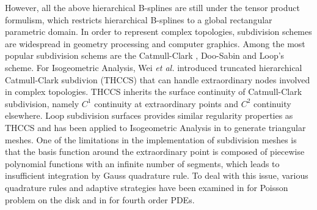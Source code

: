 \documentclass[preprint,12pt]{elsarticle}
\begin{document}
However, all the above hierarchical B-splines are still under the tensor product formulism, which restricts hierarchical B-splines to a global rectangular parametric domain. In order to represent complex topologies, subdivision schemes are widespread in geometry processing and computer graphics. Among the most popular subdivision schems are the Catmull-Clark \cite{catmull_recursively_1978}, Doo-Sabin \cite{doo_behaviour_1978} and Loop's \cite{loop_smooth_1987} scheme. For Isogeometric Analysis, Wei \textit{et al.} \cite{wei_truncated_2015} introduced truncated hierarchical Catmull-Clark subdivion (THCCS) that can handle extraordinary nodes involved in complex topologies. THCCS inherits the surface continuity of Catmull-Clark subdivision, namely $C^1$ continuity at extraordinary points and $C^2$ continuity elsewhere. Loop subdivision surfaces provides similar regularity properties as THCCS and has been applied to Isogeometric Analysis in \cite{kang_truncated_2016,pan_isogeometric_2015} to generate triangular meshes. One of the limitations in the implementation of subdivision meshes is that the basis function around the extraordinary point is composed of piecewise polynomial functions with an infinite number of segments, which leads to insufficient integration by Gauss quadrature rule. To deal with this issue, various quadrature rules and adaptive strategies have been examined in \cite{nguyen_comparative_2014} for Poisson problem on the disk and in \cite{juttler_numerical_2016} for fourth order PDEs. \par
\end{document}
